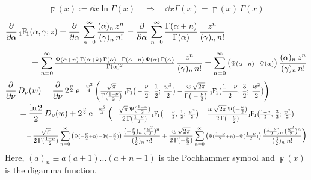 \begin{align*}
    \digamma(x) := \dd{}{x} \ln \Gamma(x)
    \quad \Longrightarrow \quad
    \dd{}{x} \Gamma(x) = \digamma(x) \, \Gamma(x)
\end{align*}
\begin{align*}
    \pd{}{\alpha} \, \hypF&(\alpha, \gamma; z)
    = \pd{}{\alpha} \, \sum_{n=0}^\infty \frac{(\alpha)_n \, z^n}{(\gamma)_n \, n!}
    = \pd{}{\alpha} \, \sum_{n=0}^\infty \frac{\Gamma(\alpha+n)}{\Gamma(\alpha)} \, \frac{z^n}{(\gamma)_n \, n!}
    \\[5pt]
    &= \sum_{n=0}^\infty \tfrac{\digamma(\alpha+n) \, \Gamma(\alpha+k) \, \Gamma(\alpha) - \Gamma(\alpha+n) \, \digamma(\alpha) \, \Gamma(\alpha)}{\Gamma(\alpha)^2} \, \frac{z^n}{(\gamma)_n \, n!}
    = \sum_{n=0}^\infty \big({ \scriptstyle \digamma(\alpha+n) - \digamma(\alpha) }\big) \, \frac{(\alpha)_n \, z^n}{(\gamma)_n \, n!}
\end{align*}
\begin{align*}
    \pd{}{\nu} \, &D_\nu(w)
    = \pd{}{\nu} \, 2^{\frac{\nu}{2}} \,
    \e{-\frac{w^2\!}{4}} \,
    \scalemath{0.8}{
    \Bigg(
        \frac{\sqrt{\pi}}{\Gamma\big( \frac{1-\nu}{2} \big)} \,
        \hypF\big( -\frac{\nu}{2}, \; \frac{1}{2} ; \; \frac{w^2}{2} \big)
        - \frac{w \, \sqrt{2\pi}}{\Gamma\big( -\frac{\nu}{2} \big)} \;
        \hypF\big( \frac{1-\nu}{2}, \, \frac{3}{2} ; \; \frac{w^2}{2} \big)
    \Bigg)
    }
    \\
    &= \frac{\ln 2}{2} \, D_\nu(w) + 2^{\frac{\nu}{2}} \,
    \e{-\frac{w^2\!}{4}} \, \Big(
        \scalemath{0.8}{
            -\frac{\sqrt{\pi} \, \digamma(\frac{1-\nu}{2})}{2 \, \Gamma(\frac{1-\nu}{2})}
            \hypF\big( -\tfrac{\nu}{2}, \, \tfrac{1}{2}; \, \tfrac{w^2}{2} \big)
            +\frac{w \, \sqrt{2\pi} \, \digamma(-\frac{\nu}{2})}{2 \, \Gamma(-\frac{\nu}{2})}
            \hypF\big( \tfrac{1-\nu}{2}, \, \tfrac{3}{2}; \, \tfrac{w^2}{2} \big)
            \, -
        }
        \\
        &\ph{=} \;
        \scalemath{0.8}{
            - \, \frac{\sqrt{\pi}}{2 \, \Gamma(\frac{1-\nu}{2})}
            \sum_{n=0}^\infty \big({ \scriptstyle \digamma(-\tfrac{\nu}{2}+n) - \digamma(-\tfrac{\nu}{2}) }\big) \, \frac{(-\tfrac{\nu}{2})_n \, (\frac{w^2}{2})^n}{(\tfrac{1}{2})_n \; n!}
            + \frac{w \, \sqrt{2\pi}}{2 \, \Gamma(-\frac{\nu}{2})}
            \sum_{n=0}^\infty \big({ \scriptstyle \digamma(\tfrac{1-\nu}{2}+n) - \digamma(\tfrac{1-\nu}{2}) }\big) \, \frac{(\tfrac{1-\nu}{2})_n \, (\tfrac{w^2}{2})^n}{(\tfrac{3}{2})_n \; n!}
        }
    \Big)
\end{align*}
Here, $(a)_n \equiv a (a+1) ... (a+n-1)$ is the Pochhammer symbol and $\digamma(x)$ is the digamma function.

